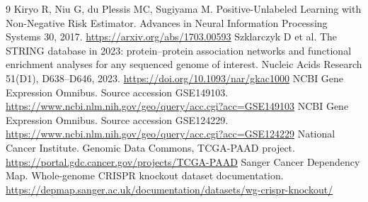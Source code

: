 \documentclass[12pt,a4paper,oneside]{report}
\begin{document}
\clearpage
\renewcommand{\bibname}{References}
\begin{thebibliography}{9}
\small
{} Kiryo R, Niu G, du Plessis MC, Sugiyama M. Positive-Unlabeled Learning with Non-Negative Risk Estimator. Advances in Neural Information Processing Systems 30, 2017. \url{https://arxiv.org/abs/1703.00593}
 Szklarczyk D et al. The STRING database in 2023: protein--protein association networks and functional enrichment analyses for any sequenced genome of interest. Nucleic Acids Research 51(D1), D638--D646, 2023. \url{https://doi.org/10.1093/nar/gkac1000}
 NCBI Gene Expression Omnibus. Source accession GSE149103. \url{https://www.ncbi.nlm.nih.gov/geo/query/acc.cgi?acc=GSE149103}
 NCBI Gene Expression Omnibus. Source accession GSE124229. \url{https://www.ncbi.nlm.nih.gov/geo/query/acc.cgi?acc=GSE124229}
 National Cancer Institute. Genomic Data Commons, TCGA-PAAD project. \url{https://portal.gdc.cancer.gov/projects/TCGA-PAAD}
 Sanger Cancer Dependency Map. Whole-genome CRISPR knockout dataset documentation. \url{https://depmap.sanger.ac.uk/documentation/datasets/wg-crispr-knockout/}
\end{thebibliography}
\end{document}
